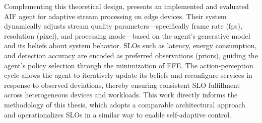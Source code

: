 Complementing this theoretical design, \cite{sedlak_adaptive_2024} presents an implemented and evaluated AIF agent for adaptive stream processing on edge devices. Their system dynamically adjusts stream quality parameters—specifically frame rate (fps), resolution (pixel), and processing mode—based on the agent’s generative model and its beliefs about system behavior. SLOs such as latency, energy consumption, and detection accuracy are encoded as preferred observations (priors), guiding the agent’s policy selection through the minimization of EFE. The action-perception cycle allows the agent to iteratively update its beliefs and reconfigure services in response to observed deviations, thereby ensuring consistent SLO fulfillment across heterogeneous devices and workloads. This work directly informs the methodology of this thesis, which adopts a comparable architectural approach and operationalizes SLOs in a similar way to enable self-adaptive control.


